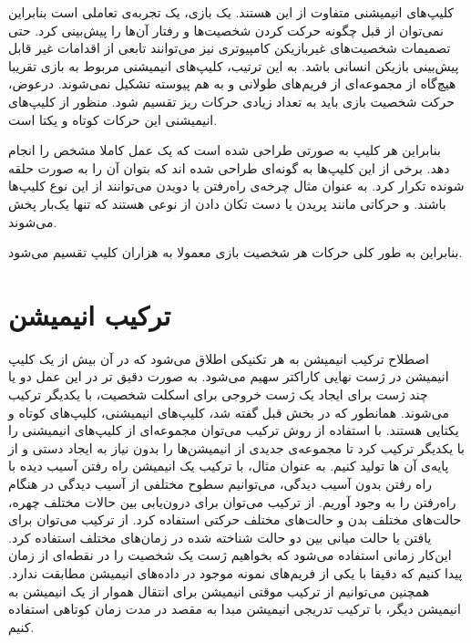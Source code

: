 کلیپ‌های انیمیشنی متفاوت از این هستند. یک بازی، یک تجربه‌ی تعاملی است بنابراین نمی‌توان از قبل چگونه حرکت کردن شخصیت‌ها و رفتار آن‌ها را پیش‌بینی کرد.
حتی تصمیمات شخصیت‌های غیربازیکن کامپیوتری نیز می‌توانند تابعی از اقدامات غیر قابل پیش‌بینی بازیکن انسانی باشد.
به این ترتیب، کلیپ‌های انیمیشنی مربوط به بازی تقریبا هیچ‌گاه از مجموعه‌ای از فریم‌های طولانی و به هم پیوسته تشکیل نمی‌شوند.
درعوض، حرکت شخصیت بازی باید به تعداد زیادی حرکات ریز تقسیم شود. 
منظور از کلیپ‌های انیمیشنی این حرکات کوتاه و یکتا است.

بنابراین هر کلیپ به صورتی طراحی شده است که یک عمل کاملا مشخص را انجام دهد. برخی از این کلیپ‌ها به گونه‌ای طراحی شده اند که بتوان آن را به صورت حلقه شونده تکرار کرد.
به عنوان مثال چرخه‌ی راه‌رفتن یا دویدن می‌توانند از این نوع کلیپ‌ها باشند.
و حرکاتی مانند پریدن یا دست تکان دادن از نوعی هستند که تنها یک‌بار پخش می‌شوند.

بنابراین به طور کلی حرکات هر شخصیت بازی معمولا به هزاران کلیپ تقسیم می‌شود. \cite{GameEngineArchitecture}

\section{ترکیب انیمیشن}

اصطلاح ترکیب انیمیشن به هر تکنیکی اطلاق می‌شود که در آن بیش از یک کلیپ انیمیشن در ژست نهایی کاراکتر سهیم می‌شود.
به صورت دقیق تر در این عمل دو یا چند ژست برای ایجاد یک ژست خروجی برای اسکلت شخصیت، با یکدیگر ترکیب می‌شوند.
همانطور که در بخش قبل گفته شد، کلیپ‌های انیمیشنی، کلیپ‌های کوتاه و یکتایی هستند. با استفاده از روش ترکیب ‌می‌توان مجموعه‌ای از کلیپ‌های انیمیشنی را با یکدیگر ترکیب کرد تا مجموعه‌ی جدیدی از انیمیشن‌ها را بدون نیاز به ایجاد دستی و از پایه‌ی آن ها تولید کنیم.
به عنوان مثال، با ترکیب یک انیمیشن راه رفتن آسیب دیده با راه رفتن بدون آسیب دیدگی، می‌توانیم سطوح مختلفی از آسیب دیدگی در هنگام راه‌رفتن را به وجود آوریم.
از ترکیب می‌توان برای درون‌یابی بین حالات مختلف چهره، حالت‌های مختلف بدن و حالت‌های مختلف حرکتی استفاده کرد.
از ترکیب می‌توان برای یافتن یا حالت میانی بین دو حالت شناخته شده در زمان‌های مختلف استفاده کرد. این‌کار زمانی استفاده می‌شود که بخواهیم ژست یک شخصیت را در نقطه‌ای از زمان پیدا کنیم که دقیقا با یکی از فریم‌های نمونه موجود در داده‌های انیمیشن مطابقت ندارد.
همچنین می‌توانیم از ترکیب موقتی انیمیشن برای انتقال هموار از یک انیمیشن به انیمیشن دیگر، با ترکیب تدریجی انیمیشن مبدا به مقصد در مدت زمان کوتاهی استفاده کنیم.